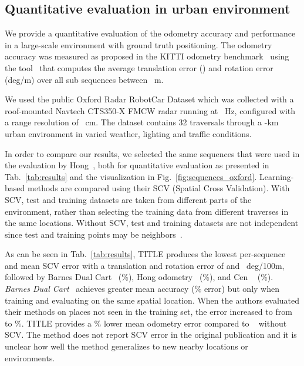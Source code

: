 \subsection{Quantitative evaluation in urban environment}
\label{sec:quantitative_eval_sec}
We provide a quantitative evaluation of the odometry accuracy and performance in a large-scale environment with ground truth positioning. The odometry accuracy was measured as proposed in the KITTI odometry benchmark~\cite{Geiger2012CVPR} using the tool~\cite{zhan2019dfvo} that computes the average translation error () and rotation error (deg/m) over all sub sequences between ~m.

We used the public Oxford Radar RobotCar Dataset which was collected with a roof-mounted Navtech CTS350-X \ac{FMCW} radar running at ~Hz, configured with a range resolution of ~cm. The dataset contains 32 traversals through a -km urban environment in varied weather, lighting and traffic conditions.

In order to compare our results, we selected the same sequences that were used in the evaluation by Hong~\cite{hong2020radarslam}, both for quantitative evaluation as presented in Tab.~\ref{tab:results} and the visualization in Fig.~\ref{fig:sequences_oxford}. Learning-based methods are compared using their SCV (Spatial Cross Validation). With SCV, test and training datasets are taken from different parts of the environment, rather than selecting the training data from different traverses in the same locations. Without SCV, test and training datasets are not independent since test and training points may be neighbors~\cite{lovelace_geocomputation_2019}.



As can be seen in Tab.~\ref{tab:results}, \ac{TITLE} produces the lowest per-sequence and mean SCV error with a translation and rotation error of  and ~deg/100m, followed by Barnes Dual Cart~\cite{barnes_masking_2020} (\%), Hong odometry~\cite{hong2020radarslam} (\%), and Cen ~\cite{8460687} (\%).
\textit{Barnes Dual Cart}~\cite{barnes_masking_2020} achieves greater mean accuracy (\% error) but only when training and evaluating on the same spatial location. When the authors evaluated their methods on places not seen in the training set, the error increased to from  to \%.
\ac{TITLE} provides a \% lower mean odometry error compared to ~\cite{barnes_under_2020} without SCV. The method does not report SCV error in the original publication and it is unclear how well the method generalizes to new nearby locations or environments. 

